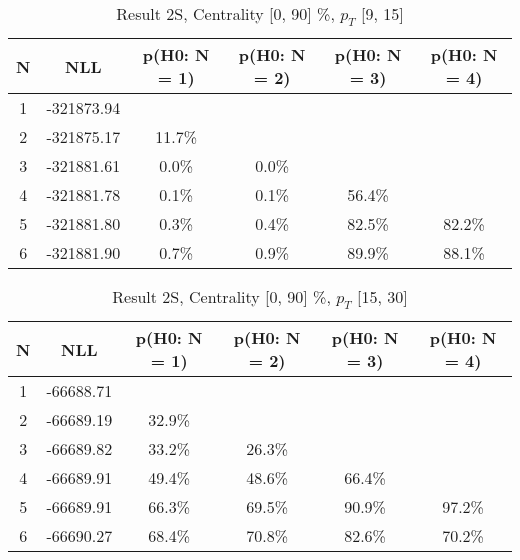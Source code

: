 \begin{table}[htb]
	\begin{center}
	\caption{Result 2S, Centrality [0, 90] \%, $p_{T}$ [9, 15] \GeV
}
{\footnotesize\renewcommand{\arraystretch}{1.4}
		\begin{tabular}{cc||cc>{\columncolor[gray]{0.8}}cc}
			N & NLL & p(H0: N = 1) & p(H0: N = 2) & p(H0: N = 3) & p(H0: N = 4)\\ 
		\hline
1 & -321873.94 & & & &\\
2 & -321875.17 & 11.7\% & & &\\
3 & -321881.61 & 0.0\% & 0.0\% & &\\
4 & -321881.78 & 0.1\% & 0.1\% & 56.4\% &\\
5 & -321881.80 & 0.3\% & 0.4\% & 82.5\% & 82.2\%\\
6 & -321881.90 & 0.7\% & 0.9\% & 89.9\% & 88.1\% \\
	\end{tabular}
		\label{tab:lab}
	}
	\end{center}\end{table}

\begin{table}[htb]
	\begin{center}
	\caption{Result 2S, Centrality [0, 90] \%, $p_{T}$ [15, 30] \GeV
}
{\footnotesize\renewcommand{\arraystretch}{1.4}
		\begin{tabular}{cc||>{\columncolor[gray]{0.8}}cccc}
			N & NLL & p(H0: N = 1) & p(H0: N = 2) & p(H0: N = 3) & p(H0: N = 4)\\ 
		\hline
1 & -66688.71 & & & &\\
2 & -66689.19 & 32.9\% & & &\\
3 & -66689.82 & 33.2\% & 26.3\% & &\\
4 & -66689.91 & 49.4\% & 48.6\% & 66.4\% &\\
5 & -66689.91 & 66.3\% & 69.5\% & 90.9\% & 97.2\%\\
6 & -66690.27 & 68.4\% & 70.8\% & 82.6\% & 70.2\% \\
	\end{tabular}
		\label{tab:lab}
	}
	\end{center}\end{table}

